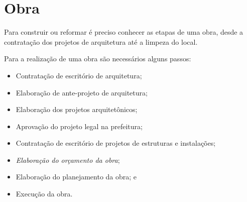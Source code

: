 \chapter{Obra}
Para construir ou reformar é preciso conhecer as etapas de uma obra, desde a contratação dos projetos de arquitetura até a limpeza do local.

Para a realização de uma obra são necessários alguns passos:

\begin{itemize}
	\item Contratação de escritório de arquitetura;
	\item Elaboração de ante-projeto de arquitetura;
	\item Elaboração dos projetos arquitetônicos;
	\item Aprovação do projeto legal na prefeitura;
	\item Contratação de escritório de projetos de estruturas e instalações;
	\item \emph{Elaboração do orçamento da obra};
	\item Elaboração do planejamento da obra; e
	\item Execução da obra.
\end{itemize}